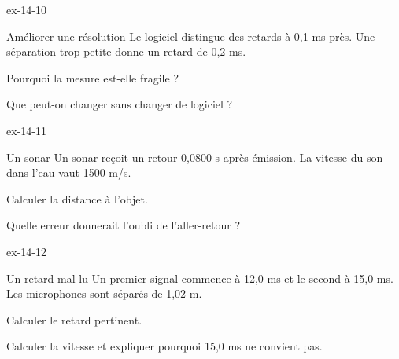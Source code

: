 \begin{blocLivre}{ex-14-10}\begin{exercice}[3]{Améliorer une résolution}
Le logiciel distingue des retards à 0,1 ms près. Une séparation trop petite donne un retard de 0,2 ms.
\begin{questions}
\item Pourquoi la mesure est-elle fragile ?
\item Que peut-on changer sans changer de logiciel ?
\end{questions}
\end{exercice}\end{blocLivre}
\begin{blocLivre}{ex-14-11}\begin{exercice}[3]{Un sonar}
Un sonar reçoit un retour 0,0800 s après émission. La vitesse du son dans l’eau vaut 1500 m/s.
\begin{questions}
\item Calculer la distance à l’objet.
\item Quelle erreur donnerait l’oubli de l’aller-retour ?
\end{questions}
\end{exercice}\end{blocLivre}
\begin{blocLivre}{ex-14-12}\begin{exercice}[3]{Un retard mal lu}
Un premier signal commence à 12,0 ms et le second à 15,0 ms. Les microphones sont séparés de 1,02 m.
\begin{questions}
\item Calculer le retard pertinent.
\item Calculer la vitesse et expliquer pourquoi 15,0 ms ne convient pas.
\end{questions}
\end{exercice}\end{blocLivre}

